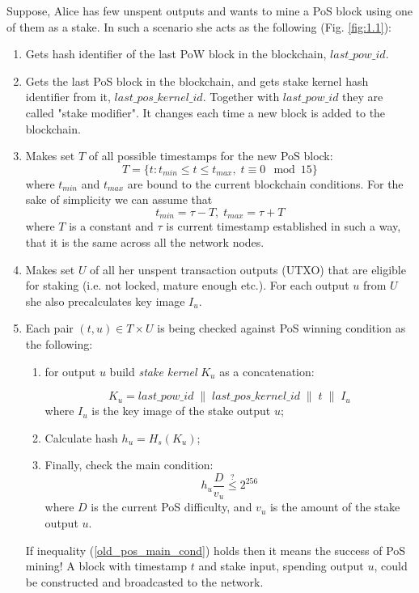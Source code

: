 \documentclass{article}
\numberwithin{figure}{section}
\begin{document}
\indent
Suppose, Alice has few unspent outputs and wants to mine a PoS block using one of them as a stake. In such a scenario she acts as the following (Fig. \ref{fig:1.1}):

\begin{enumerate}
\item Gets hash identifier of the last PoW block in the blockchain, $last\_pow\_id$.

\item Gets the last PoS block in the blockchain, and gets stake kernel hash identifier from it, $last\_pos\_kernel\_id$. Together with $last\_pow\_id$ they are called "stake modifier". It changes each time a new block is added to the blockchain. 

\item Makes set $T$ of all possible timestamps for the new PoS block:
\[ T = \{t : t_{min} \leq t \leq t_{max}, \; t \equiv 0 \mod{15} \} \]
where $t_{min}$ and $t_{max}$ are bound to the current blockchain conditions. For the sake of simplicity we can assume that
\[ t_{min} = \tau - T, \; t_{max} = \tau + T \]
where $T$ is a constant and $\tau$ is current timestamp established in such a way, that it is the same across all the network nodes.

\item Makes set $U$ of all her unspent transaction outputs (UTXO) that are eligible for staking (i.e. not locked, mature enough etc.). For each output $u$ from $U$ she also precalculates key image $I_u$.

\item Each pair $(t, u) \in T \times U$ is being checked against PoS winning condition as the following:

    \begin{enumerate}
    \item for output $u$ build \textit{stake kernel} $K_u$ as a concatenation:

    \[ K_u = last\_pow\_id \;\|\; last\_pos\_kernel\_id \;\|\; t \;\|\; I_u \]
    where $I_u$ is the key image of the stake output $u$;
    
    \item Calculate hash $h_u = H_s(K_u)$;
    
    \item Finally, check the main condition:
    \begin{equation} \label{old_pos_main_cond}
    h_u \frac{D}{v_u} \stackrel{?}{\leq} 2^{256} \end{equation} 
    where $D$ is the current PoS difficulty, and $v_u$ is the amount of the stake output $u$. 
    
    \end{enumerate}
    
    If inequality (\ref{old_pos_main_cond}) holds then it means the success of PoS mining! A block with timestamp $t$ and stake input, spending output $u$, could be constructed and broadcasted to the network.
    
\end{enumerate}
\end{document}
